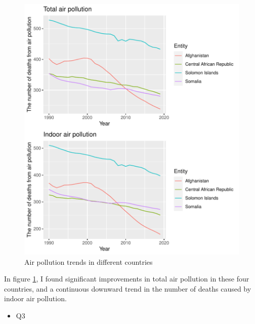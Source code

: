 \documentclass[11pt,a4paper,]{article}
\providecommand{\tightlist}{%
  \setlength{\itemsep}{0pt}\setlength{\parskip}{0pt}}
\begin{document}
\begin{figure}[H]

{\centering \includegraphics{Assignment4_files/figure-latex/airpollutionfig-1} 

}

\caption{Air pollution trends in different countries}\label{fig:airpollutionfig}
\end{figure}

In figure \ref{fig:airpollutionfig}, I found significant improvements in total air pollution in these four countries, and a continuous downward trend in the number of deaths caused by indoor air pollution.

\begin{itemize}
\tightlist
\item
  Q3
\end{itemize}
\end{document}
